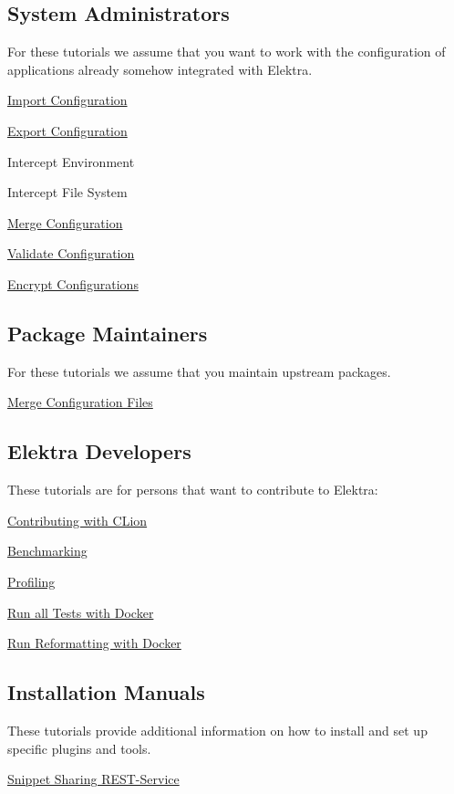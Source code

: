 \subsection*{System Administrators}

For these tutorials we assume that you want to work with the configuration of applications already somehow integrated with Elektra.


\begin{DoxyItemize}
\item \hyperlink{doc_tutorials_import_md}{Import Configuration}
\item \hyperlink{doc_tutorials_export_md}{Export Configuration}
\item Intercept Environment
\item Intercept File System
\item \hyperlink{doc_tutorials_merge_md}{Merge Configuration}
\item \hyperlink{md_doc_tutorials_validation_doc_tutorials_validation_md}{Validate Configuration}
\item \hyperlink{doc_tutorials_crypto_md}{Encrypt Configurations}
\end{DoxyItemize}

\subsection*{Package Maintainers}

For these tutorials we assume that you maintain upstream packages.


\begin{DoxyItemize}
\item \hyperlink{doc_tutorials_elektra-merge-integration_md}{Merge Configuration Files}
\end{DoxyItemize}

\subsection*{Elektra Developers}

These tutorials are for persons that want to contribute to Elektra\+:


\begin{DoxyItemize}
\item \hyperlink{doc_tutorials_contributing-clion_md}{Contributing with C\+Lion}
\item \hyperlink{doc_tutorials_benchmarking_md}{Benchmarking}
\item \hyperlink{doc_tutorials_profiling_md}{Profiling}
\item \hyperlink{doc_tutorials_run_all_tests_with_docker_md}{Run all Tests with Docker}
\item \hyperlink{doc_tutorials_run_reformatting_script_with_docker_md}{Run Reformatting with Docker}
\end{DoxyItemize}

\subsection*{Installation Manuals}

These tutorials provide additional information on how to install and set up specific plugins and tools.


\begin{DoxyItemize}
\item \hyperlink{doc_tutorials_snippet-sharing-rest-service_md}{Snippet Sharing R\+E\+S\+T-\/\+Service} 
\end{DoxyItemize}